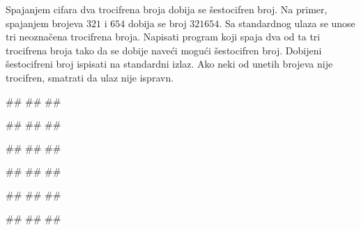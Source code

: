\begin{Exercise}[label=p1.2_09] 
Spajanjem cifara dva trocifrena broja dobija se šestocifren broj. Na primer, spajanjem brojeva $321$ i $654$ dobija se broj $321654$. Sa standardnog ulaza se unose tri neoznačena trocifrena broja.  Napisati program koji spaja dva od ta tri trocifrena broja tako da se dobije naveći mogući šestocifren broj. Dobijeni šestocifreni broj ispisati na standardni izlaz. Ako neki od unetih brojeva nije trocifren, smatrati da ulaz nije ispravn.

\begin{miditest}
\begin{upotreba}{1}
#\naslovInt#
##
##
\end{upotreba}
\end{miditest}
\begin{miditest}
\begin{upotreba}{2}
#\naslovInt#
##
##
\end{upotreba}
\end{miditest}
\begin{miditest}

\begin{upotreba}{1}
#\naslovInt#
##
##
\end{upotreba}
\end{miditest}
\begin{miditest}
\begin{upotreba}{2}
#\naslovInt#
##
##
\end{upotreba}
\end{miditest}

\begin{miditest}
\begin{upotreba}{3}
#\naslovInt#
##
##
\end{upotreba}
\end{miditest}
\begin{miditest}
\begin{upotreba}{4}
#\naslovInt#
##
##
\end{upotreba}
\end{miditest}
\end{Exercise}
\begin{Answer}[ref=p1.2_09]
\end{Answer}




